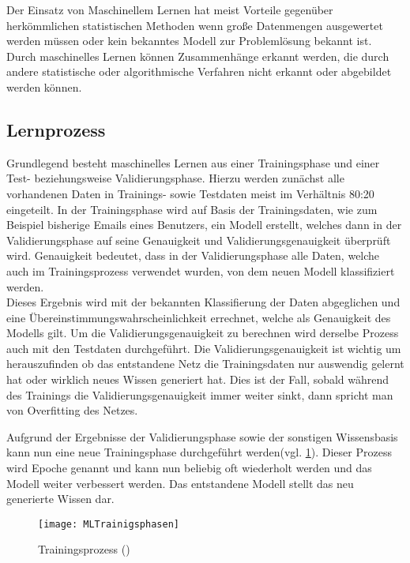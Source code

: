     Der Einsatz von Maschinellem Lernen hat meist Vorteile gegenüber herkömmlichen statistischen Methoden wenn große Datenmengen ausgewertet werden müssen oder kein bekanntes Modell zur Problemlösung bekannt ist.
    Durch maschinelles Lernen können Zusammenhänge erkannt werden, die durch andere statistische oder algorithmische Verfahren nicht erkannt oder abgebildet werden können.

    \subsection{Lernprozess} \label{Lernprozess}
    Grundlegend besteht maschinelles Lernen aus einer Trainingsphase und einer Test- beziehungsweise Validierungsphase.
    Hierzu werden zunächst alle vorhandenen Daten in Trainings- sowie Testdaten meist im Verhältnis 80:20 eingeteilt.
    In der Trainingsphase wird auf Basis der Trainingsdaten, wie zum Beispiel bisherige Emails eines Benutzers, ein Modell erstellt, welches dann in der Validierungsphase auf seine Genauigkeit und Validierungsgenauigkeit überprüft wird.
    Genauigkeit bedeutet, dass in der Validierungsphase alle Daten, welche auch im Trainingsprozess verwendet wurden, von dem neuen Modell klassifiziert werden.\\
    Dieses Ergebnis wird mit der bekannten Klassifierung der Daten abgeglichen und eine Übereinstimmungswahrscheinlichkeit errechnet, welche als Genauigkeit des Modells gilt.
    Um die Validierungsgenauigkeit zu berechnen wird derselbe Prozess auch mit den Testdaten durchgeführt.
    Die Validierungsgenauigkeit ist wichtig um herauszufinden ob das entstandene Netz die Trainingsdaten nur auswendig gelernt hat oder wirklich neues Wissen generiert hat.
    Dies ist der Fall, sobald während des Trainings die Validierungsgenauigkeit immer weiter sinkt, dann spricht man von Overfitting des Netzes.
    \newline

    \noindent
    Aufgrund der Ergebnisse der Validierungsphase sowie der sonstigen Wissensbasis kann nun eine neue Trainingsphase durchgeführt werden(vgl. \ref{fig:MLTrainigsprozess}).
    Dieser Prozess wird Epoche genannt und kann nun beliebig oft wiederholt werden und das Modell weiter verbessert werden.
    Das entstandene Modell stellt das neu generierte Wissen dar.

    \begin{figure}[H]
        \centering
        \texttt{[image: MLTrainigsphasen]}
        \caption{Trainingsprozess (\cite[Figure 1-2]{HandsOnML})}
        \label{fig:MLTrainigsprozess}
    \end{figure}


